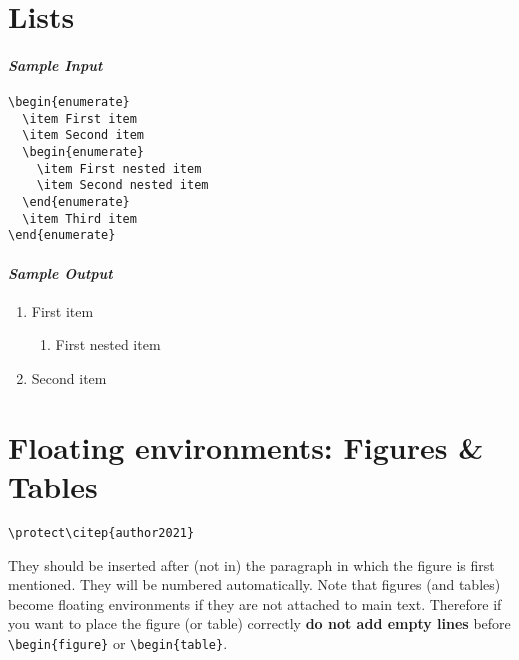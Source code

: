 \documentclass[usenatbib]{tjaa}
\begin{document}
\section{Lists}

\paragraph*{\itshape Sample Input}
\begin{verbatim}
\begin{enumerate}
  \item First item
  \item Second item
  \begin{enumerate}
    \item First nested item
    \item Second nested item
  \end{enumerate}
  \item Third item
\end{enumerate}
\end{verbatim}
\paragraph*{\itshape Sample Output}
\begin{enumerate}
  \item First item
  \begin{enumerate}
    \item First nested item
  \end{enumerate}
  \item Second item
\end{enumerate}

\newpage
\section{Floating environments: Figures \& Tables}
\begin{lrbox}{\verbbox}
\verb|\protect\citep{author2021}|
\end{lrbox}

They should be inserted after (not in) the  paragraph in which the figure is
first mentioned.
They will be numbered automatically.
Note that figures (and tables) become floating environments if they are not
attached to main text.
Therefore if you want to place the figure (or table) correctly
\textbf{do not add empty lines} before \verb|\begin{figure}| or
\verb|\begin{table}|.
\end{document}
